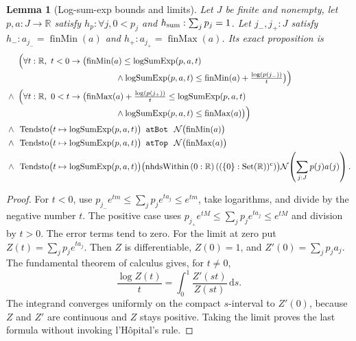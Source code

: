 \documentclass[9pt]{extarticle}
\newtheorem{lemma}{Lemma}[section]
\theoremstyle{definition}
\theoremstyle{remark}
\newcommand{\R}{\mathbb R}
\newcommand{\dd}{\,\mathrm d}
\begin{document}
\begin{lemma}[Log-sum-exp bounds and limits]
\label{lem:fnd-log-sum-exp}
Let $J$ be finite and nonempty, let $p,a:J\to\R$ satisfy
$h_p:\forall j,0<p_j$ and $h_{\rm sum}:\sum_jp_j=1$.
Let $j_-,j_+:J$ satisfy
$h_-:a_{j_-}=\operatorname{finMin}(a)$ and
$h_+:a_{j_+}=\operatorname{finMax}(a)$.  Its exact proposition is
\begin{align*}
 &\Bigl(\forall t:\R,\ t<0\to
   \bigl(\operatorname{finMin}(a)
      \leq\operatorname{logSumExp}(p,a,t)\\[-2pt]
 &\hspace{115pt}{}\wedge
      \operatorname{logSumExp}(p,a,t)
      \leq\operatorname{finMin}(a)+\tfrac{\log(p(j_-))}{t}\bigr)\Bigr)\\
 {}\wedge{}\;&\Bigl(\forall t:\R,\ 0<t\to
   \bigl(\operatorname{finMax}(a)+\tfrac{\log(p(j_+))}{t}
      \leq\operatorname{logSumExp}(p,a,t)\\[-2pt]
 &\hspace{115pt}{}\wedge
      \operatorname{logSumExp}(p,a,t)\leq\operatorname{finMax}(a)\bigr)\Bigr)\\
 {}\wedge{}\;&
 \operatorname{Tendsto}
   \bigl(t\mapsto\operatorname{logSumExp}(p,a,t)\bigr)
   \texttt{ atBot }\,\mathcal N\bigl(\operatorname{finMin}(a)\bigr)\\
 {}\wedge{}\;&
 \operatorname{Tendsto}
   \bigl(t\mapsto\operatorname{logSumExp}(p,a,t)\bigr)
   \texttt{ atTop }\,\mathcal N\bigl(\operatorname{finMax}(a)\bigr)\\
 {}\wedge{}\;&
 \operatorname{Tendsto}
   \bigl(t\mapsto\operatorname{logSumExp}(p,a,t)\bigr)
   \bigl(\operatorname{nhdsWithin}\,(0:\R)\,
      ((\{0\}:\operatorname{Set}(\R))^{\mathrm c})\bigr)
   \mathcal N\!\left(\sum_{j:J}p(j)a(j)\right).
\end{align*}
\end{lemma}

\begin{proof}
For $t<0$, use
$p_{j_-}e^{tm}\leq\sum_jp_je^{ta_j}\leq e^{tm}$, take logarithms, and divide
by the negative number $t$.  The positive case uses
$p_{j_+}e^{tM}\leq\sum_jp_je^{ta_j}\leq e^{tM}$ and division by $t>0$.
The error terms tend to zero.  For the limit at zero put
$Z(t)=\sum_jp_je^{ta_j}$.  Then $Z$ is differentiable,
$Z(0)=1$, and $Z'(0)=\sum_jp_ja_j$.  The fundamental theorem of calculus
gives, for $t\neq0$,
\[
 \frac{\log Z(t)}t
 =\int_0^1\frac{Z'(st)}{Z(st)}\dd s.
\]
The integrand converges uniformly on the compact $s$-interval to $Z'(0)$,
because $Z$ and $Z'$ are continuous and $Z$ stays positive.  Taking the
limit proves the last formula without invoking l'H\^opital's rule.
\end{proof}
\end{document}
